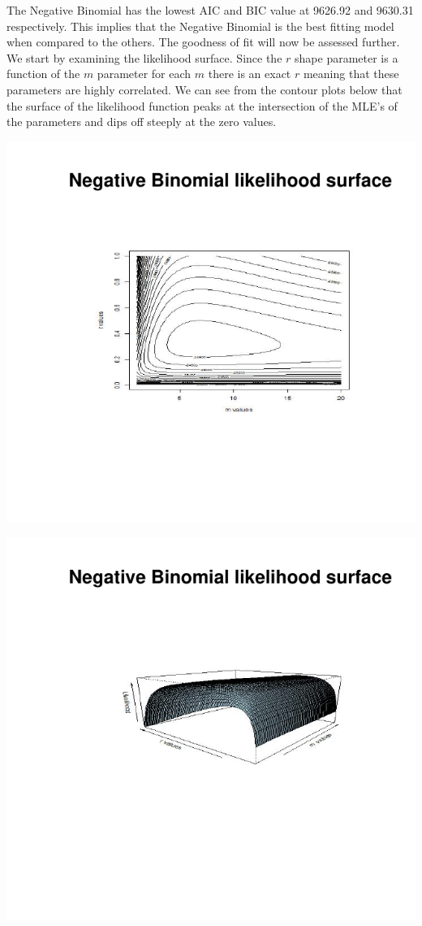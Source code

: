 \documentclass[11pt,preprint, authoryear]{elsarticle}
\numberwithin{equation}{section}
\numberwithin{figure}{section}
\numberwithin{table}{section}
\begin{document}
The Negative Binomial has the lowest AIC and BIC value at 9626.92 and
9630.31 respectively. This implies that the Negative Binomial is the
best fitting model when compared to the others. The goodness of fit will
now be assessed further. We start by examining the likelihood surface.
Since the \(r\) shape parameter is a function of the \(m\) parameter for
each \(m\) there is an exact \(r\) meaning that these parameters are
highly correlated. We can see from the contour plots below that the
surface of the likelihood function peaks at the intersection of the
MLE's of the parameters and dips off steeply at the zero values.

\includegraphics{likelihood_files/figure-latex/NegBin Likelihood vis-1.pdf}

\includegraphics{likelihood_files/figure-latex/unnamed-chunk-4-1.pdf}
\end{document}
